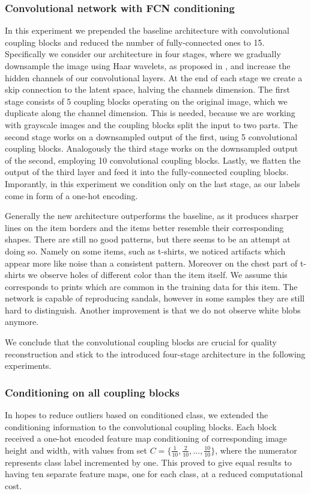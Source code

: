 \documentclass[final]{cvpr}
\begin{document}
\subsubsection{Convolutional network with FCN conditioning}
In this experiment we prepended the baseline architecture with convolutional coupling blocks and reduced the number of fully-connected ones to 15. Specifically we consider our architecture in four stages, where we gradually downsample the image using Haar wavelets, as proposed in \cite{main_paper_CINN}, and increase the hidden channels of our convolutional layers. At the end of each stage we create a skip connection to the latent space, halving the channels dimension. The first stage consists of 5 coupling blocks operating on the original image, which we duplicate along the channel dimension. This is needed, because we are working with grayscale images and the coupling blocks split the input to two parts. The second stage works on a downsampled output of the first, using 5 convolutional coupling blocks. Analogously the third stage works on the downsampled output of the second, employing 10 convolutional coupling blocks. Lastly, we flatten the output of the third layer and feed it into the fully-connected coupling blocks. Imporantly, in this experiment we condition only on the last stage, as our labels come in form of a one-hot encoding.

Generally the new architecture outperforms the baseline, as it produces sharper lines on the item borders and the items better resemble their corresponding shapes. There are still no good patterns, but there seems to be an attempt at doing so. Namely on some items, such as t-shirts, we noticed artifacts which appear more like noise than a consistent pattern. Moreover on the chest part of t-shirts we observe holes of different color than the item itself. We assume this corresponds to prints which are common in the training data for this item. The network is capable of reproducing sandals, however in some samples they are still hard to distinguish. Another improvement is that we do not observe white blobs anymore.

We conclude that the convolutional coupling blocks are crucial for quality reconstruction and stick to the introduced four-stage architecture in the following experiments.

\subsubsection{Conditioning on all coupling blocks}
In hopes to reduce outliers based on conditioned class, we extended the conditioning information to the convolutional coupling blocks. Each block received a one-hot encoded feature map conditioning of corresponding image height and width, with values from set $C = \{\frac{1}{10}, \frac{2}{10}, ..., \frac{10}{10}\}$, where the numerator represents class label incremented by one. This proved to give equal results to having ten separate feature maps, one for each class, at a reduced computational cost.
\end{document}

